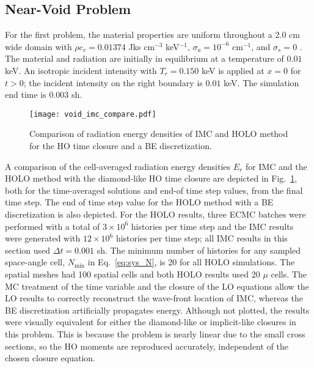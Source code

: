 \subsection{Near-Void Problem}

For the first problem, the material properties
are uniform throughout a 2.0 cm wide domain with $\rho c_v = 0.01374$ Jks cm$^{-3}$ keV$^{-1}$, $\sigma_a=10^{-6}$ cm$^{-1}$, and $\sigma_s=0$ \invcm.
The material and radiation are initially in equilibrium at a temperature of $0.01$ keV.
An isotropic incident intensity with $T_r = 0.150$ keV is applied
at $x=0$ for $t>0$; the incident intensity on the right boundary is $0.01$ keV.  The simulation end
time is 0.003 sh.      
\begin{figure}[H]
  \centering
    \texttt{[image: void\_imc\_compare.pdf]}
    \caption{\label{fig:void_imc_compare} Comparison of radiation energy densities of IMC
    and HOLO method for the HO time closure and a BE discretization.}
\end{figure}

A comparison of the cell-averaged radiation energy densities $E_r$ for IMC and the HOLO
method with the diamond-like HO time closure are depicted in Fig.~\ref{fig:void_imc_compare},
both for the time-averaged solutions and end-of time step values, from the final time
step.  The end of time step value for the HOLO method with a BE discretization is also depicted.
For the HOLO results, three ECMC batches were performed with
a total of $3\times10^6$ histories per time step and the IMC results were generated with
$12\times10^6$ histories per time step; all IMC results in this section used $\Delta t = 0.001$ sh.
The minimum number of histories for any sampled space-angle cell, $N_{\min}$ in
Eq.~\eqref{eq:sys_N}, is 20 for all HOLO simulations.
The spatial meshes had 100 spatial cells and both
HOLO results used 20 $\mu$ cells.  
The MC treatment of the time
variable and the closure of the LO equations allow the LO results to correctly reconstruct
the wave-front location of IMC, whereas the BE discretization artificially propagates
energy.   Although not plotted, the results were visually equivalent for either the diamond-like or implicit-like
closures in this problem.  This is because the problem is nearly linear due to the small
cross sections, so the HO moments are reproduced accurately, independent of the chosen closure
equation.  

